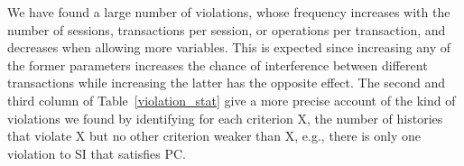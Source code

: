 We have found a large number of violations, whose frequency increases with the number of sessions, transactions per session, or operations per transaction, and decreases when allowing more variables. This is expected since increasing any of the former parameters increases the chance of interference between different transactions while increasing the latter has the opposite effect. The second and third column of Table~\ref{violation_stat} give a more precise account of the kind of violations we found by identifying for each criterion X, the number of histories that violate X but no other criterion weaker than X, e.g., there is only one violation to SI that satisfies PC.




